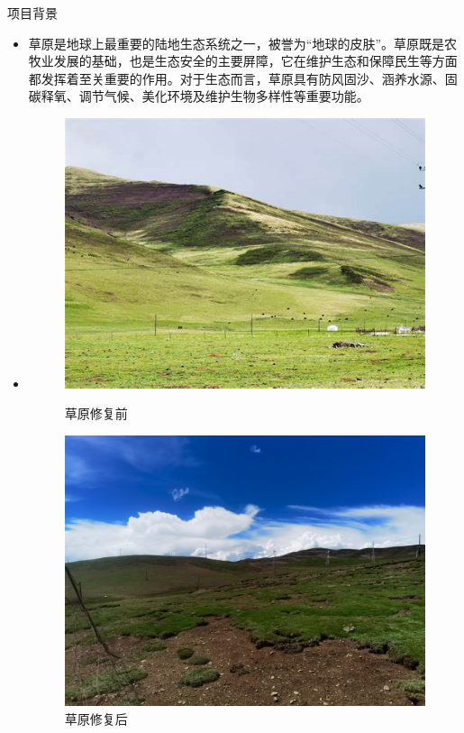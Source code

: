 \documentclass{beamer}
\begin{document}
\begin{frame}{项目背景}
    \begin{itemize}
        
        \item 草原是地球上最重要的陆地生态系统之一，被誉为“地球的皮肤”。草原既是农牧业发展的基础，也是生态安全的主要屏障，它在维护生态和保障民生等方面都发挥着至关重要的作用。对于生态而言，草原具有防风固沙、涵养水源、固碳释氧、调节气候、美化环境及维护生物多样性等重要功能。\cite{8249536}
        \item[]
    \begin{figure}[htbp]
        \begin{minipage}{0.49\linewidth}
		  \centering
            \includegraphics[scale=0.2]{pic/1.png}
            \caption{草原修复前}
	   \end{minipage}
	   \begin{minipage}{0.49\linewidth}
		  \centering
            \includegraphics[scale=0.08]{pic/2.png}
            \caption{草原修复后}
	   \end{minipage}
    \end{figure}
    \end{itemize}
\end{frame}
\end{document}
